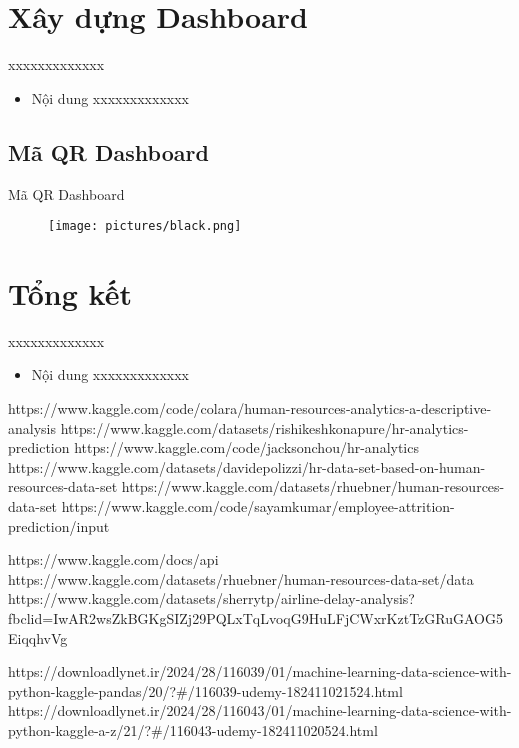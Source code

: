 \section{Xây dựng Dashboard}
\begin{frame}{xxxxxxxxxxxxx}
\begin{itemize}
\item Nội dung xxxxxxxxxxxxx
\end{itemize}
\end{frame}
\subsection{Mã QR Dashboard}
\begin{frame}{Mã QR Dashboard}

\begin{figure}[H]
\centering
\texttt{[image: pictures/black.png]}
\end{figure}

\end{frame}
\section{Tổng kết}
\begin{frame}{xxxxxxxxxxxxx}
\begin{itemize}
\item Nội dung xxxxxxxxxxxxx
\end{itemize}
\end{frame}



https://www.kaggle.com/code/colara/human-resources-analytics-a-descriptive-analysis
https://www.kaggle.com/datasets/rishikeshkonapure/hr-analytics-prediction
https://www.kaggle.com/code/jacksonchou/hr-analytics
https://www.kaggle.com/datasets/davidepolizzi/hr-data-set-based-on-human-resources-data-set
https://www.kaggle.com/datasets/rhuebner/human-resources-data-set
https://www.kaggle.com/code/sayamkumar/employee-attrition-prediction/input

https://www.kaggle.com/docs/api
https://www.kaggle.com/datasets/rhuebner/human-resources-data-set/data
https://www.kaggle.com/datasets/sherrytp/airline-delay-analysis?fbclid=IwAR2wsZkBGKgSIZj29PQLxTqLvoqG9HuLFjCWxrKztTzGRuGAOG5EiqqhvVg

https://downloadlynet.ir/2024/28/116039/01/machine-learning-data-science-with-python-kaggle-pandas/20/?#/116039-udemy-182411021524.html
https://downloadlynet.ir/2024/28/116043/01/machine-learning-data-science-with-python-kaggle-a-z/21/?#/116043-udemy-182411020524.html
